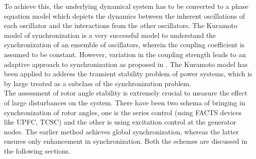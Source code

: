 \documentclass{ifacconf}
\begin{document}
To achieve this, the underlying dynamical system has to be converted to a phase equation model which depicts the dynamics between the inherent oscillations of each oscillator and the interactions from the other oscillators. 
The Kuramoto model of synchronization is a very successful model to understand the synchronization of an ensemble of oscillators, wherein the coupling coefficient is assumed to be constant. However, variation in the coupling strength leads to an adaptive approach to synchronization as proposed in \citep{Kurths}. The Kuramoto model has been applied to address the transient stability problem of power systems, which is by large treated as a subclass of the synchronization problem. \\
The assessment of rotor angle stability is extremely crucial to measure the effect of large disturbances on the system. There have been two schema of bringing in synchronization of rotor angles, one is the series control (using FACTS devices like UPFC, TCSC) and the other is using excitation control at the generator nodes. The earlier method achieves global synchronization, whereas the latter ensures only enhancement in synchronization. Both the schemes are discussed in the following sections.\\
\vspace{-1em}
\end{document}
